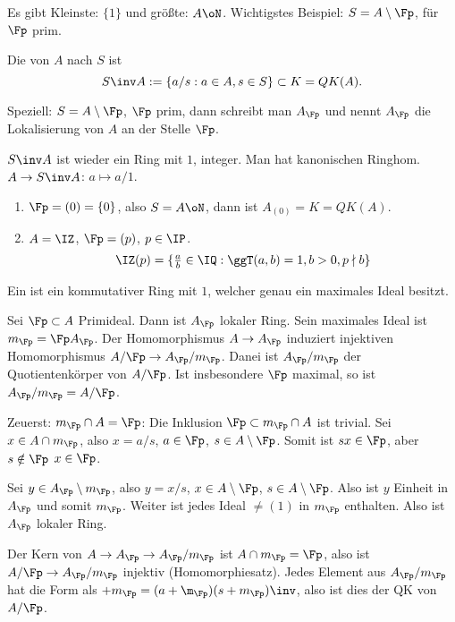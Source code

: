 \begin{Beispiel}
 Es gibt Kleinste: $\{1\}$ und größte: $A\oN$. Wichtigstes Beispiel: $S=A\setminus\Fp$, für $\Fp$ prim.
\end{Beispiel}

\begin{Definition}
 Die  von $A$ nach $S$ ist 
 \[ S\inv A:=\{a/s : a\in A, s\in S\}\subset K=QK(A).\]
 
 Speziell: $S=A\setminus \Fp$, $\Fp$ prim, dann schreibt man $A_\Fp$ und nennt $A_\Fp$ die Lokalisierung von $A$ an der Stelle $\Fp$.
\end{Definition}

\begin{Bemerkung}
 $S\inv A$ ist wieder ein Ring mit $1$, integer. Man hat kanonischen Ringhom. $A\rightarrow S\inv A$: $a\mapsto a/1$.
\end{Bemerkung}

\begin{Beispiel}
 \begin{enumerate}
  \item $\Fp=(0)=\{0\}$, also $S=A\oN$, dann ist $A_{(0)}=K=QK(A)$.
  \item $A=\IZ$, $\Fp=(p)$, $p\in\IP$.
  \[\IZ(p)=\{\tfrac{a}{b}\in\IQ : \ggT(a,b)=1, b>0, p\nmid b \} \]
 \end{enumerate}
\end{Beispiel}

\begin{Definition}
 Ein  ist ein kommutativer Ring mit $1$, welcher genau ein maximales Ideal besitzt.
\end{Definition}

\begin{Fakt}
 Sei $\Fp\subset A$ Primideal. Dann ist $A_\Fp$ lokaler Ring. Sein maximales Ideal ist $m_\Fp=\Fp A_\Fp$. Der Homomorphismus $A\rightarrow A_\Fp$ induziert injektiven Homomorphismus
 $A/\Fp \rightarrow A_\Fp/m_\Fp$. Danei ist $A_\Fp/m_\Fp$ der Quotientenkörper von $A/\Fp$. Ist insbesondere $\Fp$ maximal, so ist $A_\Fp/m_\Fp=A/\Fp$.
\end{Fakt}

\begin{Beweis}
 Zeuerst: $m_\Fp\cap A=\Fp$: Die Inklusion $\Fp\subset m_\Fp\cap A$ ist trivial. Sei $x\in A\cap m_\Fp$, also $x=a/s$, $a\in\Fp$, $s\in A\setminus\Fp$. Somit ist $sx\in\Fp$, aber $s\notin\Fp$ \folge $x\in\Fp$.
 
 Sei $y\in A_\Fp\setminus m_\Fp$, also $y=x/s$, $x\in A\setminus\Fp$, $s\in A\setminus\Fp$. Also ist $y$ Einheit in $A_\Fp$ und somit $m_\Fp$. Weiter ist jedes Ideal $\neq (1)$ in $m_\Fp$ enthalten. Also ist $A_\Fp$ lokaler Ring.
 
 Der Kern von $A\rightarrow A_\Fp\rightarrow A_\Fp/m_\Fp$ ist $A\cap m_\Fp=\Fp$, also ist $A/\Fp\rightarrow A_\Fp/m_\Fp$ injektiv (Homomorphiesatz). Jedes Element aus $A_\Fp/m_\Fp$ hat die Form als $+m_\Fp=(a+\m_\Fp)(s+m_\Fp)\inv$, also ist dies der QK von $A/\Fp$.
\end{Beweis}

